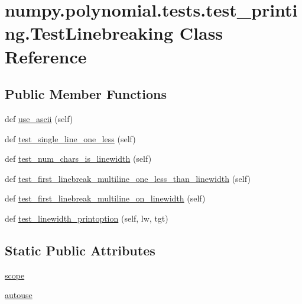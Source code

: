 \hypertarget{classnumpy_1_1polynomial_1_1tests_1_1test__printing_1_1TestLinebreaking}{}\section{numpy.\+polynomial.\+tests.\+test\+\_\+printing.\+Test\+Linebreaking Class Reference}
\label{classnumpy_1_1polynomial_1_1tests_1_1test__printing_1_1TestLinebreaking}
\subsection*{Public Member Functions}
\begin{DoxyCompactItemize}
\item 
def \hyperlink{classnumpy_1_1polynomial_1_1tests_1_1test__printing_1_1TestLinebreaking_a6d7a582707dcbd3a7b305453e61ff372}{use\+\_\+ascii} (self)
\item 
def \hyperlink{classnumpy_1_1polynomial_1_1tests_1_1test__printing_1_1TestLinebreaking_a1f693baf65516c1c59c5bea1643e8d5e}{test\+\_\+single\+\_\+line\+\_\+one\+\_\+less} (self)
\item 
def \hyperlink{classnumpy_1_1polynomial_1_1tests_1_1test__printing_1_1TestLinebreaking_acf50961c31daac489255b895c1df36d6}{test\+\_\+num\+\_\+chars\+\_\+is\+\_\+linewidth} (self)
\item 
def \hyperlink{classnumpy_1_1polynomial_1_1tests_1_1test__printing_1_1TestLinebreaking_abaee73d9910d7e8943fee375f748f355}{test\+\_\+first\+\_\+linebreak\+\_\+multiline\+\_\+one\+\_\+less\+\_\+than\+\_\+linewidth} (self)
\item 
def \hyperlink{classnumpy_1_1polynomial_1_1tests_1_1test__printing_1_1TestLinebreaking_a19713249c596f8de325f674cf9e376f8}{test\+\_\+first\+\_\+linebreak\+\_\+multiline\+\_\+on\+\_\+linewidth} (self)
\item 
def \hyperlink{classnumpy_1_1polynomial_1_1tests_1_1test__printing_1_1TestLinebreaking_a721134dbe661b6554c4b65bcd6185945}{test\+\_\+linewidth\+\_\+printoption} (self, lw, tgt)
\end{DoxyCompactItemize}
\subsection*{Static Public Attributes}
\begin{DoxyCompactItemize}
\item 
\hyperlink{classnumpy_1_1polynomial_1_1tests_1_1test__printing_1_1TestLinebreaking_a450c6d948069b0a6a526a4c4a7c84a2a}{scope}
\item 
\hyperlink{classnumpy_1_1polynomial_1_1tests_1_1test__printing_1_1TestLinebreaking_aa2b6f08a06ff8e046df9ec48edb995a0}{autouse}
\end{DoxyCompactItemize}


